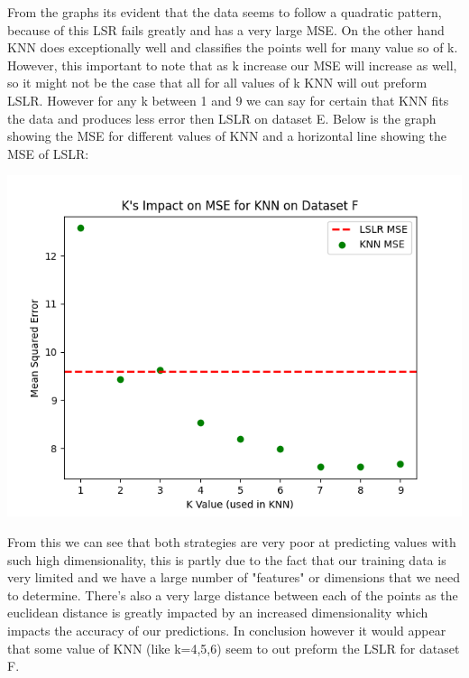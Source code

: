 \documentclass{article}
\begin{document}
\begin{titlepage}
From the graphs its evident that the data seems to follow a quadratic pattern, because of this LSR fails greatly and has a very large MSE. On the other hand KNN does exceptionally well and classifies the points well for many value so of k. However, this important to note that as k increase our MSE will increase as well, so it might not be the case that all for all values of k KNN will out preform LSLR. However for any k between 1 and 9 we can say for certain that KNN fits the data and produces less error then LSLR on dataset E.
\newpage
Below is the graph showing the MSE for different values of KNN and a horizontal line showing the MSE of LSLR:

\begin{center}
\textbf{\includegraphics[width=14cm]{F_1.png}}
\end{center}

From this we can see that both strategies are very poor at predicting values with such high dimensionality, this is partly due to the fact that our training data is very limited and we have a large number of "features" or dimensions that we need to determine. There's also a very large distance between each of the points as the euclidean distance is greatly impacted by an increased dimensionality which impacts the accuracy of our predictions. In conclusion however it would appear that some value of KNN (like k=4,5,6) seem to out preform the LSLR for dataset F.
\end{titlepage}
\end{document}

